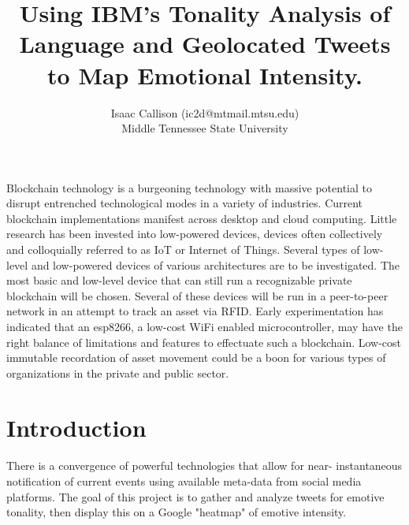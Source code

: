 \documentclass[12pt, oneside]{article}
\title{Using IBM's Tonality Analysis of Language and Geolocated Tweets to Map Emotional Intensity.
\\\medskip}
\author{Isaac Callison (ic2d@mtmail.mtsu.edu)\\Middle Tennessee State University}
\begin{document}
\maketitle
\nocite{*}
\newpage{}


\renewenvironment{abstract}
 {\small
  \begin{center}
  \bfseries \abstractname\vspace{-.5em}\vspace{0pt}
  \end{center}
  \list{}{
    \setlength{\leftmargin}{.8cm}%
    \setlength{\rightmargin}{\leftmargin}%
  }%
  \item\relax}
 {\endlist}

\begin{abstract}
Blockchain technology is a burgeoning technology with massive potential to
disrupt entrenched technological modes in a variety of industries.
Current blockchain implementations manifest across desktop and cloud computing.
Little research has been invested into low-powered devices, devices often
collectively and colloquially referred to as IoT or Internet of Things. Several
types of low-level and low-powered devices of various architectures are
to be investigated. The most basic and low-level device that can still run a
recognizable private blockchain will be chosen. Several of these devices will
be run in a peer-to-peer network in an attempt to track an asset via RFID.
Early experimentation has indicated that an esp8266, a low-cost WiFi enabled
microcontroller, may have the right balance of limitations and features to
effectuate such a blockchain. Low-cost immutable recordation of asset movement
could be a boon for various types of organizations in the private and public
sector.
\end{abstract}



\section{Introduction}
\paragraph{}
There is a convergence of powerful technologies that allow for near-
instantaneous notification of current events using available meta-data from
social media platforms. The goal of this project is to gather and analyze
tweets for emotive tonality, then display this on a Google "heatmap" of emotive
intensity.
\end{document}

